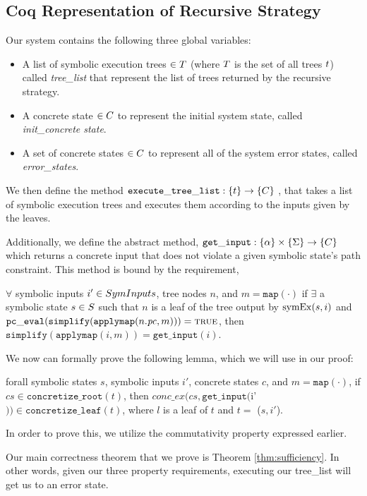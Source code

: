 \subsection{Coq Representation of Recursive Strategy}
Our system contains the following three global variables:
\begin{itemize}
\item A list of symbolic execution trees $\in T$ (where $T$ is the set of all trees $t$) called \textit{tree\_list} that represent the list of trees returned by the recursive strategy.
\item A concrete state $\in C$ to represent the initial system state, called \textit{init\_concrete state}.
\item A set of concrete states $\in C$ to represent all of the system error states, called \textit{error\_states}.
\end{itemize}

We then define the method $ \mathtt{execute\_tree\_list} : \{t\} \rightarrow \{C\}$ , that takes a list of symbolic execution trees and executes them according to the inputs given by the leaves.

Additionally, we define the abstract method, $ \mathtt{get\_input} : \{\alpha\} \times \{\Sigma\} \rightarrow \{C\}$ which returns a concrete input that does not violate a given symbolic state's path constraint.
This method is bound by the requirement,

\begin{definition}
$ \forall$ symbolic inputs $i' \in SymInputs$, tree nodes $n$, and $m = \mathtt{map(\cdot)}$
if $\exists$ a symbolic state $s \in S$  such that
$n$ is a leaf of the tree output by $\mathrm{symEx}(s, i)$ and 
$\mathtt{pc\_eval} (\mathtt{simplify}(\mathtt{applymap} (n.\mathit{pc}, m))) = \mathtt{\textsc{true}}$, then
$\mathtt{simplify}(\mathtt{applymap} (i, m)) = \mathtt{get\_input}(i)$.
\end{definition}



We now can formally prove the following lemma, which we will use in our proof:
\begin{lemma} \label{cop}
forall symbolic states $s$, symbolic inputs $i'$, concrete states $c$, and $m = \mathtt{map(\cdot)}$,
if $cs \in \mathtt{concretize\_root}(t)$,
then 
$conc\_ex(cs, \mathtt{get\_input} ($i'$)) \in \mathtt{concretize\_leaf}(t)$,
where $l$ is a leaf of $t$ and $t = $ \symexecution($s, i'$).
\end{lemma}

In order to prove this, we utilize the commutativity property expressed earlier.





Our main correctness theorem that we prove is Theorem \ref{thm:sufficiency}. In other words, given our three property requirements, executing our tree\_list will get us to an error state.
